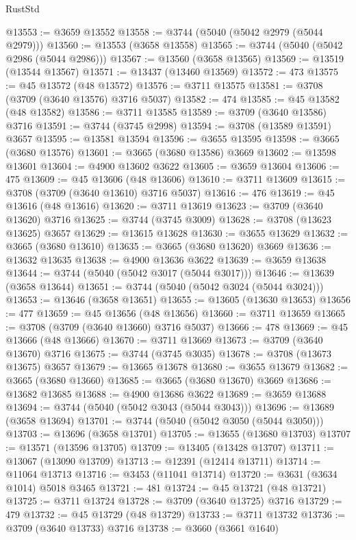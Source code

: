 \begin{lexlean}{RustStd}
\begin{coremodule}
@13553 := @3659 @13552
@13558 := @3744 (@5040 (@5042 @2979 (@5044 @2979)))
@13560 := @13553 (@3658 @13558)
@13565 := @3744 (@5040 (@5042 @2986 (@5044 @2986)))
@13567 := @13560 (@3658 @13565)
@13569 := @13519 (@13544 @13567)
@13571 := @13437 (@13460 @13569)
@13572 := 473
@13575 := @45 @13572 (@48 @13572)
@13576 := @3711 @13575
@13581 := @3708 (@3709 (@3640 @13576) @3716 @5037)
@13582 := 474
@13585 := @45 @13582 (@48 @13582)
@13586 := @3711 @13585
@13589 := @3709 (@3640 @13586) @3716
@13591 := @3744 (@3745 @2998)
@13594 := @3708 (@13589 @13591) @3657
@13595 := @13581 @13594
@13596 := @3655 @13595
@13598 := @3665 (@3680 @13576)
@13601 := @3665 (@3680 @13586) @3669
@13602 := @13598 @13601
@13604 := @4900 @13602 @3622
@13605 := @3659 @13604
@13606 := 475
@13609 := @45 @13606 (@48 @13606)
@13610 := @3711 @13609
@13615 := @3708 (@3709 (@3640 @13610) @3716 @5037)
@13616 := 476
@13619 := @45 @13616 (@48 @13616)
@13620 := @3711 @13619
@13623 := @3709 (@3640 @13620) @3716
@13625 := @3744 (@3745 @3009)
@13628 := @3708 (@13623 @13625) @3657
@13629 := @13615 @13628
@13630 := @3655 @13629
@13632 := @3665 (@3680 @13610)
@13635 := @3665 (@3680 @13620) @3669
@13636 := @13632 @13635
@13638 := @4900 @13636 @3622
@13639 := @3659 @13638
@13644 := @3744 (@5040 (@5042 @3017 (@5044 @3017)))
@13646 := @13639 (@3658 @13644)
@13651 := @3744 (@5040 (@5042 @3024 (@5044 @3024)))
@13653 := @13646 (@3658 @13651)
@13655 := @13605 (@13630 @13653)
@13656 := 477
@13659 := @45 @13656 (@48 @13656)
@13660 := @3711 @13659
@13665 := @3708 (@3709 (@3640 @13660) @3716 @5037)
@13666 := 478
@13669 := @45 @13666 (@48 @13666)
@13670 := @3711 @13669
@13673 := @3709 (@3640 @13670) @3716
@13675 := @3744 (@3745 @3035)
@13678 := @3708 (@13673 @13675) @3657
@13679 := @13665 @13678
@13680 := @3655 @13679
@13682 := @3665 (@3680 @13660)
@13685 := @3665 (@3680 @13670) @3669
@13686 := @13682 @13685
@13688 := @4900 @13686 @3622
@13689 := @3659 @13688
@13694 := @3744 (@5040 (@5042 @3043 (@5044 @3043)))
@13696 := @13689 (@3658 @13694)
@13701 := @3744 (@5040 (@5042 @3050 (@5044 @3050)))
@13703 := @13696 (@3658 @13701)
@13705 := @13655 (@13680 @13703)
@13707 := @13571 (@13596 @13705)
@13709 := @13405 (@13428 @13707)
@13711 := @13067 (@13090 @13709)
@13713 := @12391 (@12414 @13711)
@13714 := @11064 @13713
@13716 := @3453 (@11041 @13714)
@13720 := @3631 (@3634 @1014) @5018 @3465
@13721 := 481
@13724 := @45 @13721 (@48 @13721)
@13725 := @3711 @13724
@13728 := @3709 (@3640 @13725) @3716
@13729 := 479
@13732 := @45 @13729 (@48 @13729)
@13733 := @3711 @13732
@13736 := @3709 (@3640 @13733) @3716
@13738 := @3660 (@3661 @1640)

\end{coremodule}
\end{lexlean}
